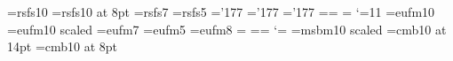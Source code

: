 

\newfam\scrfam
\batchmode\font\tenscr=rsfs10 \errorstopmode
\ifx\tenscr\nullfont
        \def\scr{\cal}
\else   \font\eightscr=rsfs10 at 8pt
        \font\sevenscr=rsfs7
        \font\fivescr=rsfs5
        \skewchar\tenscr='177 \skewchar\sevenscr='177 \skewchar\fivescr='177
        \textfont\scrfam=\tenscr \scriptfont\scrfam=\sevenscr
        \scriptscriptfont\scrfam=\fivescr
        \def\scr{\fam\scrfam}
        \def\cal{\scr}
\fi
\catcode`\@=11
\newfam\frakfam
\batchmode\font\tenfrak=eufm10 \errorstopmode
\ifx\tenfrak\nullfont
        \def\frak{\it}
\else
	\font\twelvefrak=eufm10 scaled
	\font\sevenfrak=eufm7 \font\fivefrak=eufm5
        \font\eightfrak=eufm8
	\textfont\frakfam=\tenfrak
	\scriptfont\frakfam=\sevenfrak \scriptscriptfont\frakfam=\fivefrak
	\def\frak{\fam\frakfam}
\fi
\catcode`\@=\active
\newfam\msbfam
\batchmode\font\twelvemsb=msbm10 scaled \errorstopmode
\ifx\twelvemsb\nullfont\def\Bbb{\bf}
        \font\fourteenbbb=cmb10 at 14pt
	\font\eightbbb=cmb10 at 8pt
